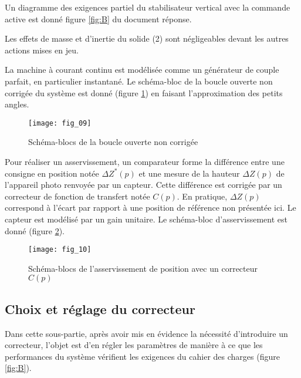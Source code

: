 Un diagramme des exigences partiel du stabilisateur vertical avec la commande active est donné figure \ref{fig:B} du document réponse.

Les effets de masse et d'inertie du solide (2) sont négligeables devant les autres actions mises en jeu.

\ifprof
\begin{corrige}
\end{corrige}
\else
\fi





La machine à courant continu est modélisée comme un générateur de couple parfait, en particulier instantané. Le schéma-bloc de la boucle ouverte non corrigée du système est donné (figure \ref{fig:09}) en faisant l'approximation des petits angles.

\begin{figure}[H]
\centering
\texttt{[image: fig\_09]}
\caption{\label{fig:09} Schéma-blocs de la boucle ouverte non corrigée}
\end{figure}


Pour réaliser un asservissement, un comparateur forme la différence entre une consigne en position notée $\Delta Z^{*}(p)$ et une mesure de la hauteur $\Delta Z(p)$ de l'appareil photo renvoyée par un capteur. Cette différence est corrigée par un correcteur de fonction de transfert notée $C(p)$. En pratique, $\Delta Z(p)$ correspond à l'écart par rapport à une position de référence non présentée ici. Le capteur est modélisé par un gain unitaire. Le schéma-bloc d'asservissement est donné (figure \ref{fig:10}).

\begin{figure}[H]
\centering
\texttt{[image: fig\_10]}
\caption{\label{fig:10} Schéma-blocs de l'asservissement de position avec un correcteur $C(p)$}
\end{figure}



\subsection{Choix et réglage du correcteur}
Dans cette sous-partie, après avoir mis en évidence la nécessité d'introduire un correcteur, l'objet est d'en régler les paramètres de manière à ce que les performances du système vérifient les exigences du cahier des charges (figure \ref{fig:B}).

